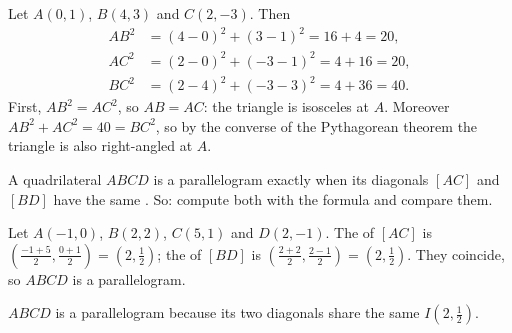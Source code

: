 \begin{example}\label{ex:g10:coordgeom:triangle}
Let $A(0, 1)$, $B(4, 3)$ and $C(2, -3)$. Then
\begin{align*}
AB^2 &= (4-0)^2 + (3-1)^2 = 16 + 4 = 20, \\
AC^2 &= (2-0)^2 + (-3-1)^2 = 4 + 16 = 20, \\
BC^2 &= (2-4)^2 + (-3-3)^2 = 4 + 36 = 40 .
\end{align*}
First, $AB^2 = AC^2$, so $AB = AC$: the triangle is isosceles at $A$.
Moreover $AB^2 + AC^2 = 40 = BC^2$, so by the converse of the Pythagorean
theorem the triangle is also right-angled at $A$.
\end{example}

\begin{method}\label{met:g10:coordgeom:parallelogram}
A quadrilateral $ABCD$ is a parallelogram exactly when its diagonals
$[AC]$ and $[BD]$ have the same . So: compute both  with
the  formula and compare them.
\end{method}

\begin{example}\label{ex:g10:coordgeom:parallelogram}
Let $A(-1, 0)$, $B(2, 2)$, $C(5, 1)$ and $D(2, -1)$. The  of
$[AC]$ is $\left(\frac{-1+5}{2}, \frac{0+1}{2}\right) = (2, \frac12)$; the
 of $[BD]$ is $\left(\frac{2+2}{2}, \frac{2-1}{2}\right) =
(2, \frac12)$. They coincide, so $ABCD$ is a parallelogram.
\end{example}

\begin{omfigure}

{\small $ABCD$ is a parallelogram because its two diagonals share the same
 $I(2, \frac12)$.}
\end{omfigure}

